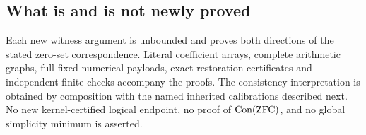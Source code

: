 



\subsection{What is and is not newly proved}
Each new witness argument is unbounded and proves both directions of the
stated zero-set correspondence. Literal coefficient arrays, complete
arithmetic graphs, full fixed numerical payloads, exact restoration
certificates and independent finite checks accompany the proofs.
The consistency interpretation is obtained by composition with the named
inherited calibrations described next. No new kernel-certified logical
endpoint, no proof of $\operatorname{Con}(\mathrm{ZFC})$, and no global simplicity
minimum is asserted.
